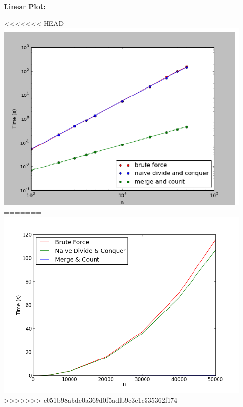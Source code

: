 \documentclass[letterpaper,10pt,titlepage,fleqn]{article}
\begin{document}
\textbf{Linear Plot:}
\vskip 0.04in
\begin{center}
<<<<<<< HEAD
  \includegraphics[width=5in]{loglog.ps}
=======
  \includegraphics[width=5in]{input_time.png}
>>>>>>> e051b98abde0a369d0f5adfb9c3e1c535362f174
\end{center}
\end{document}
